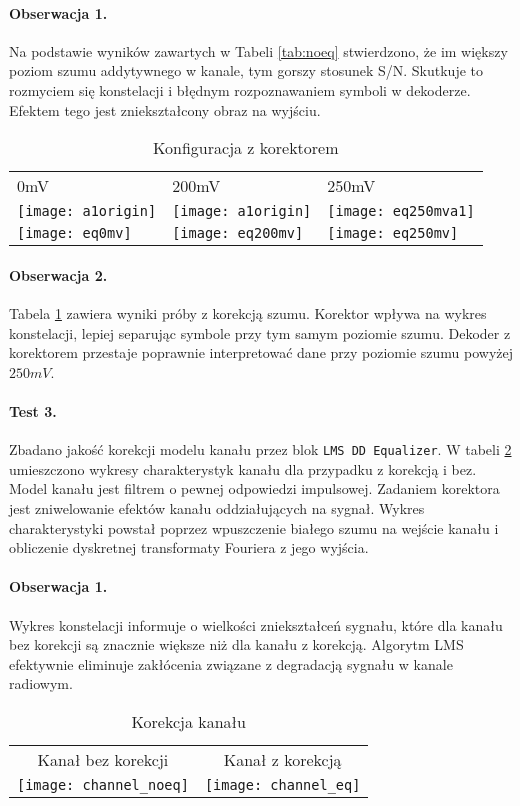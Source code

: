 \paragraph{Obserwacja 1.}
Na podstawie wyników zawartych w Tabeli \ref{tab:noeq} stwierdzono, że im większy poziom szumu addytywnego w kanale, tym gorszy stosunek S/N. 
Skutkuje to rozmyciem się konstelacji i błędnym rozpoznawaniem symboli w dekoderze.
Efektem tego jest zniekształcony obraz na wyjściu. 


\begin{table}[h]
\centering
\caption{Konfiguracja z korektorem}
\label{tab:eq}
\begin{tabular}{|l|l|l|}
\hline
0mV      & 200mV    & 250mV    \\
\texttt{[image: a1origin]} & \texttt{[image: a1origin]} & \texttt{[image: eq250mva1]} \\
\texttt{[image: eq0mv]}   & \texttt{[image: eq200mv]}   & \texttt{[image: eq250mv]}  \\ \hline
\end{tabular}
\end{table}

\paragraph{Obserwacja 2.}
Tabela \ref{tab:eq} zawiera wyniki próby z korekcją szumu.
Korektor wpływa na wykres konstelacji, lepiej separując symbole przy tym samym poziomie szumu.
Dekoder z korektorem przestaje poprawnie interpretować dane przy poziomie szumu powyżej $250mV$.

\paragraph{Test 3.}
Zbadano jakość korekcji modelu kanału przez blok \texttt{LMS DD Equalizer}.
W tabeli \ref{channel_eq} umieszczono wykresy charakterystyk kanału dla przypadku z korekcją i bez.
Model kanału jest filtrem o pewnej odpowiedzi impulsowej.
Zadaniem korektora jest zniwelowanie efektów kanału oddziałujących na sygnał.
Wykres charakterystyki powstał poprzez wpuszczenie białego szumu na wejście kanału i obliczenie dyskretnej transformaty Fouriera z jego wyjścia.

\paragraph{Obserwacja 1.}
Wykres konstelacji informuje o wielkości zniekształceń sygnału, które dla kanału bez korekcji są znacznie większe niż dla kanału z korekcją.
Algorytm LMS efektywnie eliminuje zakłócenia związane z degradacją sygnału w kanale radiowym.


\begin{table}[h]
\centering
\caption{Korekcja kanału}
\label{channel_eq}
\begin{tabular}{|c|c|}
\hline
Kanał bez korekcji & Kanał z korekcją \\
\texttt{[image: channel\_noeq]}      & \texttt{[image: channel\_eq]}      \\ \hline
\end{tabular}
\end{table}




